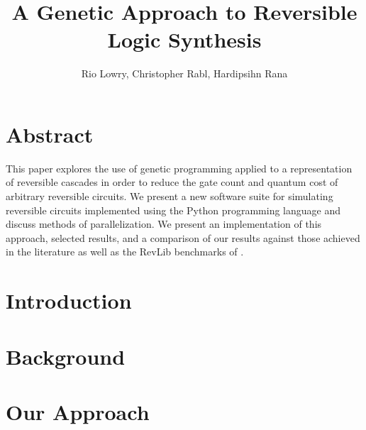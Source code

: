 \documentclass[12pt]{article}
\title{A Genetic Approach to Reversible Logic Synthesis}
\author{Rio Lowry, Christopher Rabl, Hardipsihn Rana}
\date{}
\begin{document}
\maketitle

\section*{Abstract}


This paper explores the use of genetic programming applied to a representation of reversible cascades in order to reduce the gate count and quantum cost of arbitrary reversible circuits. We present a new software suite for simulating reversible circuits implemented using the Python programming language and discuss methods of parallelization. We present an implementation of this approach, selected results, and a comparison of our results against those achieved in the literature as well as the RevLib benchmarks of \cite{RevLib}.

\begingroup
\let\clearpage\relax
\section{Introduction}



\section{Background}










\section{Our Approach}







\endgroup

\pagebreak


\end{document}
